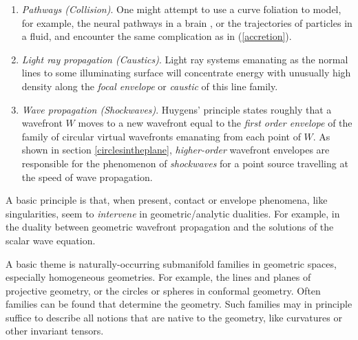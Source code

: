 \documentclass[12pt]{article}
\numberwithin{equation}{section}
\newcounter{count}
\theoremstyle{plain}
\theoremstyle{definition}
\begin{document}
\begin{enumerate}
\item{\emph{Pathways (Collision)}. One might attempt to use a curve foliation to model, for example, the neural pathways in a brain \cite{braincurves}, or the trajectories of particles in a fluid, and encounter the same complication as in (\ref{accretion}).}
\item{\emph{Light ray propagation (Caustics)}. Light ray systems emanating as the normal lines to some illuminating surface will concentrate energy with unusually high density along the \emph{focal envelope} or \emph{caustic} of this line family.}
\item{\emph{Wave propagation (Shockwaves)}. Huygens' principle states roughly that a wavefront $W$ moves to a new wavefront equal to the \emph{first order envelope} of the family of circular virtual wavefronts emanating from each point of $W$. As shown in section \ref{circlesintheplane}, \emph{higher-order} wavefront envelopes are responsible for the phenomenon of \emph{shockwaves} for a point source travelling at the speed of wave propagation.}
\end{enumerate}


A basic principle is that, when present, contact or envelope phenomena, like singularities, seem to \emph{intervene} in geometric/analytic dualities. For example, in the duality between geometric wavefront propagation and the solutions of the scalar wave equation.

A basic theme is naturally-occurring submanifold families in geometric spaces, especially homogeneous geometries. For example, the lines and planes of projective geometry, or the circles or spheres in conformal geometry. Often families can be found that determine the geometry. Such families may in principle suffice to describe all notions that are native to the geometry, like curvatures or other invariant tensors.
\end{document}
